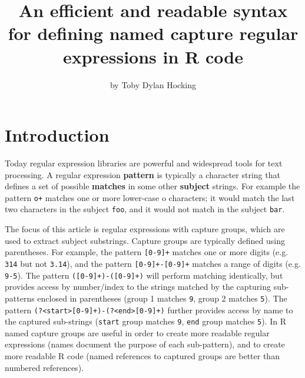 \title{An efficient and readable syntax for defining named capture
  regular expressions in R code}

\author{by Toby Dylan Hocking}

\maketitle

\section{Introduction}

Today regular expression libraries are powerful and widespread tools
for text processing. A regular expression \textbf{pattern} is
typically a character string that defines a set of possible
\textbf{matches} in some other \textbf{subject} strings. For example
the pattern \verb|o+| matches one or more lower-case o characters; it
would match the last two characters in the subject \verb|foo|, and it
would not match in the subject \verb|bar|. 

The focus of this article is regular expressions with capture groups,
which are used to extract subject substrings. Capture groups are
typically defined using parentheses. For example, the pattern
\verb|[0-9]+| matches one or more digits (e.g. \verb|314| but not
\verb|3.14|), and the pattern \verb|[0-9]+-[0-9]+| matches a range of
digits (e.g. \verb|9-5|). The pattern \verb|([0-9]+)-([0-9]+)| will
perform matching identically, but provides access by number/index to
the strings matched by the capturing sub-patterns enclosed in
parentheses (group 1 matches \verb|9|, group 2 matches \verb|5|). The
pattern \verb|(?<start>[0-9]+)-(?<end>[0-9]+)| further provides access
by name to the captured sub-strings (\verb|start| group matches
\verb|9|, \verb|end| group matches \verb|5|). In R named capture
groups are useful in order to create more readable regular expressions
(names document the purpose of each sub-pattern), and to create more
readable R code (named references to captured groups are better than
numbered references).

